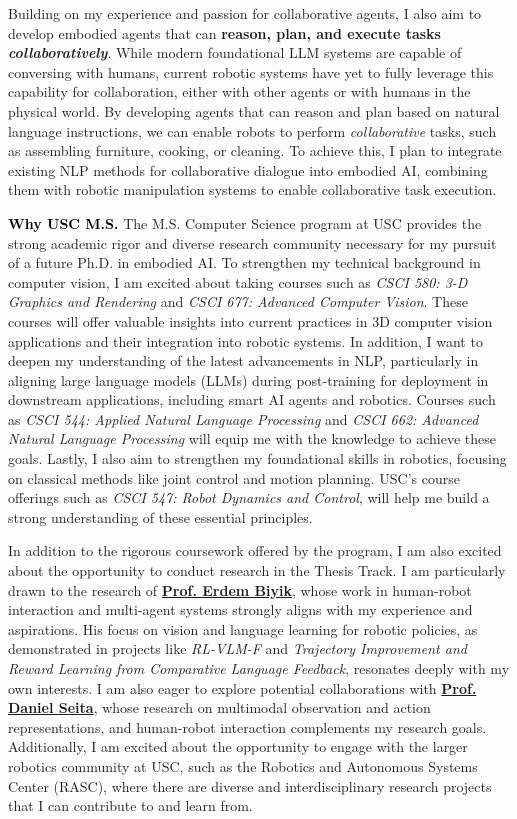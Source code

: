 \documentclass[10pt]{article}
\newcommand{\statement}[1]{\medskip\noindent
  \textcolor{black}{\textbf{#1}}\space
}
\begin{document}
\noindent Building on my experience and passion for collaborative agents, I also aim to develop embodied agents that can \textbf{reason, plan, and execute tasks \textit{collaboratively}}. While modern foundational LLM systems are capable of conversing with humans, current robotic systems have yet to fully leverage this capability for collaboration, either with other agents or with humans in the physical world. By developing agents that can reason and plan based on natural language instructions, we can enable robots to perform \textit{collaborative} tasks, such as assembling furniture, cooking, or cleaning. To achieve this, I plan to integrate existing NLP methods for collaborative dialogue into embodied AI, combining them with robotic manipulation systems to enable collaborative task execution.

\statement{Why USC M.S.} The M.S. Computer Science program at USC provides the strong academic rigor and diverse research community necessary for my pursuit of a future Ph.D. in embodied AI. To strengthen my technical background in computer vision, I am excited about taking courses such as \textit{CSCI 580: 3-D Graphics and Rendering} and \textit{CSCI 677: Advanced Computer Vision}. These courses will offer valuable insights into current practices in 3D computer vision applications and their integration into robotic systems. In addition, I want to deepen my understanding of the latest advancements in NLP, particularly in aligning large language models (LLMs) during post-training for deployment in downstream applications, including smart AI agents and robotics. Courses such as \textit{CSCI 544: Applied Natural Language Processing} and \textit{CSCI 662: Advanced Natural Language Processing} will equip me with the knowledge to achieve these goals. Lastly, I also aim to strengthen my foundational skills in robotics, focusing on classical methods like joint control and motion planning. USC's course offerings such as \textit{CSCI 547: Robot Dynamics and Control}, will help me build a strong understanding of these essential principles.

\noindent In addition to the rigorous coursework offered by the program, I am also excited about the opportunity to conduct research in the Thesis Track. I am particularly drawn to the research of \href{https://ebiyik.github.io/}{\textbf{Prof. Erdem Biyik}}, whose work in human-robot interaction and multi-agent systems strongly aligns with my experience and aspirations.  His focus on vision and language learning for robotic policies, as demonstrated in projects like \textit{RL-VLM-F} and \textit{Trajectory Improvement and Reward Learning from Comparative Language Feedback}, resonates deeply with my own interests. I am also eager to explore potential collaborations with \href{https://danielseita.github.io/}{\textbf{Prof. Daniel Seita}}, whose research on multimodal observation and action representations, and human-robot interaction complements my research goals. Additionally, I am excited about the opportunity to engage with the larger robotics community at USC, such as the Robotics and Autonomous Systems Center (RASC), where there are diverse and interdisciplinary research projects that I can contribute to and learn from.
\end{document}
